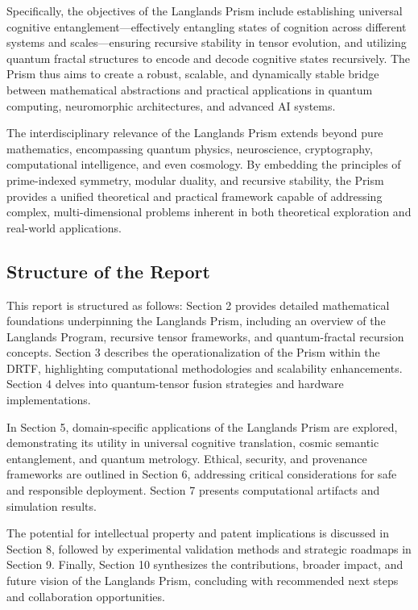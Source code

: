 \documentclass[11pt]{article}
\begin{document}
Specifically, the objectives of the Langlands Prism include establishing universal cognitive entanglement—effectively entangling states of cognition across different systems and scales—ensuring recursive stability in tensor evolution, and utilizing quantum fractal structures to encode and decode cognitive states recursively. The Prism thus aims to create a robust, scalable, and dynamically stable bridge between mathematical abstractions and practical applications in quantum computing, neuromorphic architectures, and advanced AI systems.

The interdisciplinary relevance of the Langlands Prism extends beyond pure mathematics, encompassing quantum physics, neuroscience, cryptography, computational intelligence, and even cosmology. By embedding the principles of prime-indexed symmetry, modular duality, and recursive stability, the Prism provides a unified theoretical and practical framework capable of addressing complex, multi-dimensional problems inherent in both theoretical exploration and real-world applications.

\subsection{Structure of the Report}

This report is structured as follows: Section 2 provides detailed mathematical foundations underpinning the Langlands Prism, including an overview of the Langlands Program, recursive tensor frameworks, and quantum-fractal recursion concepts. Section 3 describes the operationalization of the Prism within the DRTF, highlighting computational methodologies and scalability enhancements. Section 4 delves into quantum-tensor fusion strategies and hardware implementations.

In Section 5, domain-specific applications of the Langlands Prism are explored, demonstrating its utility in universal cognitive translation, cosmic semantic entanglement, and quantum metrology. Ethical, security, and provenance frameworks are outlined in Section 6, addressing critical considerations for safe and responsible deployment. Section 7 presents computational artifacts and simulation results.

The potential for intellectual property and patent implications is discussed in Section 8, followed by experimental validation methods and strategic roadmaps in Section 9. Finally, Section 10 synthesizes the contributions, broader impact, and future vision of the Langlands Prism, concluding with recommended next steps and collaboration opportunities.
\end{document}
